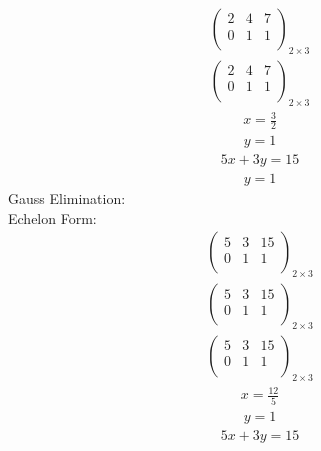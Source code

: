 \documentclass{article}
\begin{document}
\begin{align*}
\left(
\begin{array}{cc|c}
2 & 4 & 7\\
0 & 1 & 1\\
\end{array}
\right)_{2\times 3}
\end{align*}
\begin{align*}
\left(
\begin{array}{cc|c}
2 & 4 & 7\\
0 & 1 & 1\\
\end{array}
\right)_{2\times 3}
\end{align*}
\begin{align*}
x=\frac{3}{2}\end{align*}
\begin{align*}
y=1\end{align*}
\begin{align*}
5x + 3y=15\end{align*}
\begin{align*}
y=1\end{align*}
Gauss Elimination:\\
Echelon Form:\\
\begin{align*}
\left(
\begin{array}{cc|c}
5 & 3 & 15\\
0 & 1 & 1\\
\end{array}
\right)_{2\times 3}
\end{align*}
\begin{align*}
\left(
\begin{array}{cc|c}
5 & 3 & 15\\
0 & 1 & 1\\
\end{array}
\right)_{2\times 3}
\end{align*}
\begin{align*}
\left(
\begin{array}{cc|c}
5 & 3 & 15\\
0 & 1 & 1\\
\end{array}
\right)_{2\times 3}
\end{align*}
\begin{align*}
x=\frac{12}{5}\end{align*}
\begin{align*}
y=1\end{align*}
\begin{align*}
5x + 3y=15\end{align*}
\end{document}
